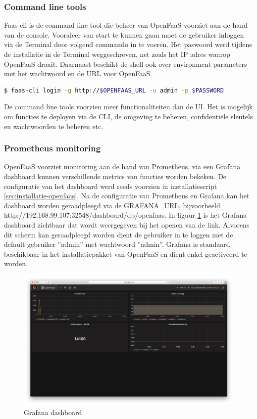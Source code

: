 \subsubsection{Command line tools}
Faas-cli is de command line tool die beheer van OpenFaaS voorziet aan de hand van de console. Vooraleer van start te kunnen gaan moet de gebruiker inloggen via de Terminal door volgend commando in te voeren. Het paswoord werd tijdens de installatie in de Terminal weggeschreven, net zoals het IP adres waarop OpenFaaS draait. Daarnaast beschikt de shell ook over environment parameters met het wachtwoord en de URL voor OpenFaaS.
\begin{lstlisting}[language=bash]
$ faas-cli login -g http://$OPENFAAS_URL -u admin -p $PASSWORD
\end{lstlisting}
De command line tools voorzien meer functionaliteiten dan de UI. Het is mogelijk om functies te deployen via de CLI, de omgeving te beheren, confidentiële sleutels en wachtwoorden te beheren etc.

\subsubsection{Prometheus monitoring}
OpenFaaS voorziet monitoring aan de hand van Prometheus, via een Grafana dashboard kunnen verschillende metrics van functies worden bekeken. De configuratie van het dashboard werd reeds voorzien in installatiescript \ref{sec:installatie-openfaas}. Na de configuratie van Prometheus en Grafana kan het dashboard worden geraadpleegd via de GRAFANA\_URL, bijvoorbeeld http://192.168.99.107:32548/dashboard/db/openfaas. In figuur \ref{fig:grafana-dashboard} is het Grafana dashboard zichtbaar dat wordt weergegeven bij het openen van de link. Alvorens dit scherm kan geraadpleegd worden dient de gebruiker in te loggen met de default gebruiker ''admin'' met wachtwoord ''admin''. Grafana is standaard beschikbaar in het installatiepakket van OpenFaaS en dient enkel geactiveerd te worden.
\begin{figure}
    \includegraphics[width=1\textwidth]{img/grafana-dashboard.png}
    \caption{Grafana dashboard}
    \label{fig:grafana-dashboard}  
\end{figure}

